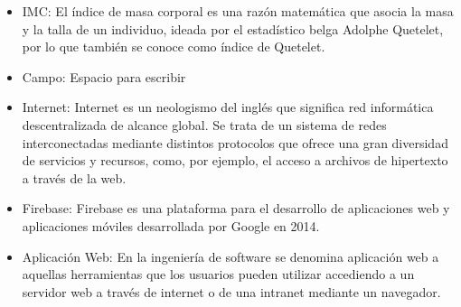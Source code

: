 \documentclass[a4paper, 12pt]{article}
\begin{document}
\begin{itemize}
\item IMC: El índice de masa corporal es una razón matemática que asocia la masa y la talla de un individuo, ideada por el estadístico belga Adolphe Quetelet, por lo que también se conoce como índice de Quetelet.
\item Campo: Espacio para escribir
\item Internet: Internet es un neologismo del inglés que significa red informática descentralizada de alcance global. Se trata de un sistema de redes interconectadas mediante distintos protocolos que ofrece una gran diversidad de servicios y recursos, como, por ejemplo, el acceso a archivos de hipertexto a través de la web.

\item Firebase: Firebase es una plataforma para el desarrollo de aplicaciones web y aplicaciones móviles desarrollada por Google en 2014.
\item Aplicación Web: En la ingeniería de software se denomina aplicación web a aquellas herramientas que los usuarios pueden utilizar accediendo a un servidor web a través de internet o de una intranet mediante un navegador.
\end{itemize}
\end{document}

